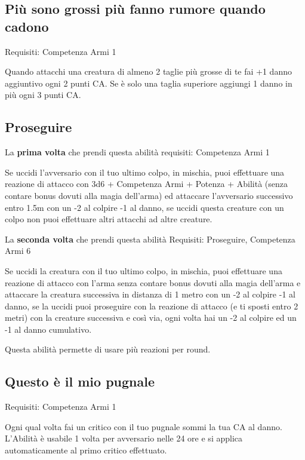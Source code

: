 \documentclass[a4paper,11pt,twoside,openany]{book}
\begin{document}
\subsection{Più sono grossi più fanno rumore quando cadono}

Requisiti: Competenza Armi 1

Quando attacchi una creatura di almeno 2 taglie più grosse di te fai +1 danno aggiuntivo ogni 2 punti CA. Se è solo una taglia superiore aggiungi 1 danno in più ogni 3 punti CA.

\subsection{Proseguire}

La \textbf{prima volta} che prendi questa abilità requisiti: Competenza Armi 1

Se uccidi l'avversario con il tuo ultimo colpo, in mischia, puoi effettuare una reazione di attacco con 3d6 + Competenza Armi + Potenza + Abilità (senza contare bonus dovuti alla magia dell'arma) ed attaccare l'avversario successivo entro 1.5m con un -2 al colpire -1 al danno, se uccidi questa creature con un colpo non puoi effettuare altri attacchi ad altre creature.

La \textbf{seconda volta} che prendi questa abilità Requisiti: Proseguire, Competenza Armi 6

Se uccidi la creatura con il tuo ultimo colpo, in mischia, puoi effettuare una reazione di attacco con l'arma senza contare bonus dovuti alla magia dell'arma e attaccare la creatura successiva in distanza di 1 metro con un -2 al colpire -1 al danno, se la uccidi puoi proseguire con la reazione di attacco (e ti sposti entro 2 metri) con la creature successiva e così via, ogni volta hai un -2 al colpire ed un -1 al danno cumulativo.

Questa abilità permette di usare più reazioni per round.

\subsection{Questo è il mio pugnale}

Requisiti: Competenza Armi 1

Ogni qual volta fai un critico con il tuo pugnale sommi la tua CA al danno. L'Abilità è usabile 1 volta per avversario nelle 24 ore e si applica automaticamente al primo critico effettuato.
\end{document}
